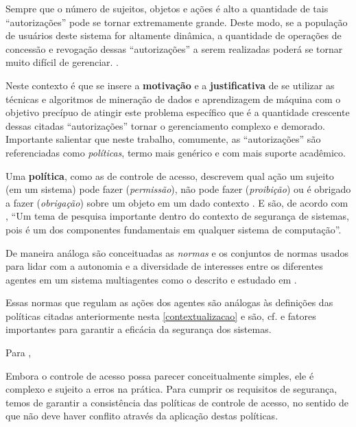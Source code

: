 \documentclass[
	12pt,				%
	openright,			%
	oneside,			%
	a4paper,			%
	english,			%
	french,				%
	spanish,			%
	brazil				%
	]{abntex2}
\begin{document}
Sempre que o número de sujeitos, objetos e ações é alto a quantidade de tais ``autorizações'' pode se tornar extremamente grande. Deste modo, se a população de usuários deste sistema for altamente dinâmica, a quantidade de operações de concessão e revogação dessas ``autorizações'' a serem realizadas poderá se tornar muito difícil de gerenciar. \cite[p. 21]{bellettini_role_2001}.

Neste contexto é que se insere a \textbf{motivação} e a \textbf{justificativa} de se utilizar as técnicas e algoritmos de mineração de dados e aprendizagem de máquina com o objetivo precípuo de atingir este problema específico que é a quantidade crescente dessas citadas ``autorizações'' tornar o gerenciamento complexo e demorado. Importante salientar que neste trabalho, comumente, as ``autorizações'' são referenciadas como \textit{políticas}, termo mais genérico e com mais suporte acadêmico. 

Uma \textbf{política}, como as de controle de acesso, descrevem qual ação um sujeito (em um sistema) pode fazer (\textit{permissão}), não pode fazer (\textit{proibição}) ou é obrigado a fazer (\textit{obrigação}) sobre um objeto em um dado contexto \cite{sarkis2017}. E são, de acordo com , ``Um tema de pesquisa importante dentro do contexto de segurança de sistemas, pois é um dos componentes fundamentais em qualquer sistema de computação''.

De maneira análoga são conceituadas as \textit{normas} e os conjuntos de normas usados para lidar com a autonomia e a diversidade de interesses entre os diferentes agentes em um sistema multiagentes como o descrito e estudado em . 

Essas normas que regulam as ações dos agentes são análogas às definições das políticas citadas anteriormente nesta \autoref{contextualizacao} e são, cf.  e  fatores importantes para garantir a eficácia da segurança dos sistemas.

Para ,
\begin{citacao}
Embora o controle de acesso possa parecer conceitualmente simples, ele é complexo e sujeito a erros na prática. Para cumprir os requisitos de segurança, temos de garantir a consistência das políticas de controle de acesso, no sentido de que não deve haver conflito através da aplicação destas políticas.
\end{citacao}
\end{document}
